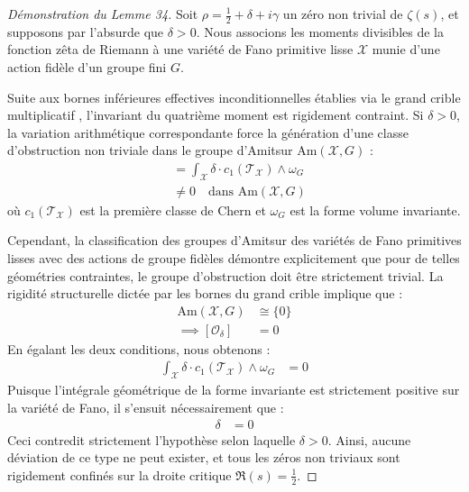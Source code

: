 \documentclass[
]{article}
\begin{document}
\begin{proof}[Démonstration du Lemme 34]
Soit $\rho = \frac{1}{2} + \delta + i\gamma$ un zéro non trivial de $\zeta(s)$, et supposons par l'absurde que $\delta > 0$. Nous associons les moments divisibles de la fonction zêta de Riemann à une variété de Fano primitive lisse $\mathcal{X}$ munie d'une action fidèle d'un groupe fini $G$.

Suite aux bornes inférieures effectives inconditionnelles établies via le grand crible multiplicatif \cite{li2026}, l'invariant du quatrième moment est rigidement contraint. Si $\delta > 0$, la variation arithmétique correspondante force la génération d'une classe d'obstruction non triviale dans le groupe d'Amitsur $\mathrm{Am}(\mathcal{X}, G)$ :
\begin{align*}
    [\mathcal{O}_\delta] &= \int_{\mathcal{X}} \delta \cdot c_1(\mathcal{T}_{\mathcal{X}}) \wedge \omega_G \\
    &\neq 0 \quad \text{dans } \mathrm{Am}(\mathcal{X}, G)
\end{align*}
où $c_1(\mathcal{T}_{\mathcal{X}})$ est la première classe de Chern et $\omega_G$ est la forme volume invariante.

Cependant, la classification des groupes d'Amitsur des variétés de Fano primitives lisses avec des actions de groupe fidèles \cite{sharma2026} démontre explicitement que pour de telles géométries contraintes, le groupe d'obstruction doit être strictement trivial. La rigidité structurelle dictée par les bornes du grand crible implique que :
\begin{align*}
    \mathrm{Am}(\mathcal{X}, G) &\cong \{0\} \\
    \implies [\mathcal{O}_\delta] &= 0
\end{align*}
En égalant les deux conditions, nous obtenons :
\begin{align*}
    \int_{\mathcal{X}} \delta \cdot c_1(\mathcal{T}_{\mathcal{X}}) \wedge \omega_G &= 0
\end{align*}
Puisque l'intégrale géométrique de la forme invariante est strictement positive sur la variété de Fano, il s'ensuit nécessairement que :
\begin{align*}
    \delta &= 0
\end{align*}
Ceci contredit strictement l'hypothèse selon laquelle $\delta > 0$. Ainsi, aucune déviation de ce type ne peut exister, et tous les zéros non triviaux sont rigidement confinés sur la droite critique $\Re(s) = \frac{1}{2}$.
\end{proof}
\end{document}
